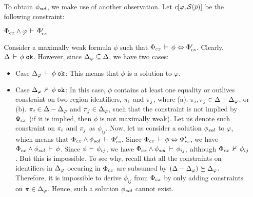 To obtain $\phi_{sol}$, we make use of another observation. Let $c\lbrack
\varphi, \mathcal{S}(\overline{\rho}) \rbrack$ be the following constraint:
\begin{center}
\(
  \Phi_{cx} \wedge \varphi\,\vdash\,\Phi_{cs}'
\)
\end{center}
Consider a maximally weak formula $\phi$ such that
$\Phi_{cx}\,\vdash\,\phi \Leftrightarrow \Phi_{cs}'$. 
Clearly, $\Delta\,\vdash\,\phi \; \texttt{ok}$. However, since $\Delta_{\varphi}
\subseteq \Delta$, we have two cases:
\begin{itemize}

\item Case $\Delta_{\varphi}\,\vdash\,\phi \; \texttt{ok}$: This means that $\phi$ is
a solution to $\varphi$. 

\item Case $\Delta_{\varphi}\,\nvdash\,\phi \; \texttt{ok}$: In this case, $\phi$
contains at least one equality or outlives constraint on two region
identifiers, $\pi_i$ and $\pi_j$, where (a). $\pi_i,\pi_j \in
\Delta - \Delta_{\varphi}$, or (b). $\pi_i \in \Delta -
\Delta_{\varphi}$ and $\pi_j \in \Delta_{\varphi}$, such that the
constraint is not implied by $\Phi_{cx}$ (if it is implied, then $\phi$
is not maximally weak). Let us denote such constraint on $\pi_i$ and
$\pi_j$ as $\phi_{ij}$. Now, let us consider a solution $\phi_{sol}$ to
$\varphi$, which means that $\Phi_{cx} \wedge \phi_{sol}\,\vdash\,\Phi_{cs}'$.
Since $\Phi_{cx}\,\vdash\,\phi \Leftrightarrow \Phi_{cs}'$, we have
$\Phi_{cx} \wedge \phi_{sol}\,\vdash\,\phi$. Since
$\phi\,\vdash\,\phi_{ij}$, we have $\Phi_{cx} \wedge
\phi_{sol}\,\vdash\,\phi_{ij}$, although $\Phi_{cx}\,\nvdash\,\phi_{ij}$. But
this is impossible. To see why, recall that all the constraints on
identifiers in $\Delta_{\varphi}$ occuring in $\Phi_{cx}$ are subsumed
by $(\Delta - \Delta_{\varphi}) \succeq \Delta_{\varphi}$.
Therefore, it is impossible to derive $\phi_{ij}$ from $\Phi_{cx}$ by
only adding constraints on $\pi \in \Delta_{\varphi}$. Hence, such a
solution $\phi_{sol}$ cannot exist.
\end{itemize}

